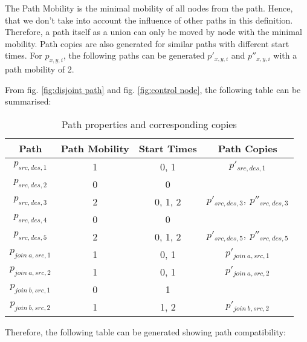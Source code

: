 \documentclass[conference]{IEEEtran}
\begin{document}
The Path Mobility is the minimal mobility of all nodes from the path. Hence, that we don’t take into account the influence of other paths in this definition. Therefore, a path itself as a union can only be moved by node with the minimal mobility. Path copies are also generated for similar paths with different start times. For \( p_{x,y,i} \), the following paths can be generated \( p'_{x,y,i} \) and \( p''_{x,y,i} \) with a path mobility of 2. 

From fig. \ref{fig:disjoint path} and fig. \ref{fig:control node}, the following table can be summarised:

\begin{table}[h!]
\centering
\renewcommand{\arraystretch}{1.4}
\begin{tabular}{|c|c|c|c|}
\hline
\textbf{Path} & \textbf{Path Mobility} & \textbf{Start Times} & \textbf{Path Copies} \\
\hline
$p_{src,des,1}$ & 1 & 0, 1 & $p'_{src,des,1}$ \\
$p_{src,des,2}$ & 0 & 0 & \\
$p_{src,des,3}$ & 2 & 0, 1, 2 & $p'_{src,des,3},\ p''_{src,des,3}$ \\
$p_{src,des,4}$ & 0 & 0 & \\
$p_{src,des,5}$ & 2 & 0, 1, 2 & $p'_{src,des,5},\ p''_{src,des,5}$ \\
$p_{join\ a,src,1}$ & 1 & 0, 1 & $p'_{join\ a,src,1}$ \\
$p_{join\ a,src,2}$ & 1 & 0, 1 & $p'_{join\ a,src,2}$ \\
$p_{join\ b,src,1}$ & 0 & 1 & \\
$p_{join\ b,src,2}$ & 1 & 1, 2 & $p'_{join\ b,src,2}$ \\
\hline
\end{tabular}
\vspace{0.5em}
\caption{Path properties and corresponding copies}
\end{table}

Therefore, the following table can be generated showing path compatibility:
\end{document}
